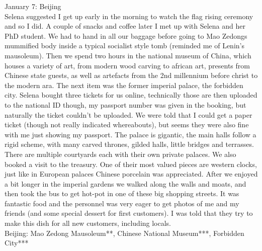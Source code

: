 January 7: Beijing\\
Selena suggested I get up early in the morning to watch the flag rising ceremony and so I did. A couple of snacks and coffee later I met up with Selena and her PhD student. We had to hand in all our baggage before going to Mao Zedongs mummified body inside a typical socialist style tomb (reminded me of Lenin's mausoleum). Then we spend two hours in the national museum of China, which houses a variety of art, from modern wood carving to african art, presents from Chinese state guests, as well as artefacts from the 2nd millennium before christ to the modern ara. The next item was the former imperial palace, the forbidden city. Selena bought three tickets for us online, technically those are then uploaded to the national ID though, my passport number was given in the booking, but naturally the ticket couldn't be uploaded. We were told that I could get a paper ticket (though not really indicated whereabouts), but seems they were also fine with me just showing my passport. The palace is gigantic, the main halls follow a rigid scheme, with many carved thrones, gilded halls, little bridges and terrasses. There are multiple courtyards each with their own private palaces. We also booked a visit to the treasury. One of their most valued pieces are western clocks, just like in European palaces Chinese porcelain was appreciated. After we enjoyed a bit longer in the imperial gardens we walked along the walls and moats, and then took the bus to get hot-pot in one of these big shopping streets. It was fantastic food and the personnel was very eager to get photos of me and my friends (and some special dessert for first customers). I was told that they try to make this dish for all new customers, including locals. \\

Beijing: Mao Zedong Mausoleum**, Chinese National Museum***, Forbidden City***\\


